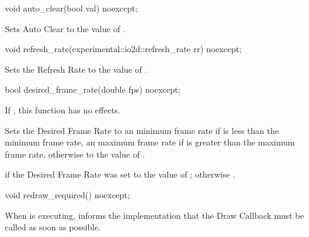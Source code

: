 \begin{itemdecl}
void auto_clear(bool val) noexcept;
\end{itemdecl}
\begin{itemdescr}
\pnum
\effects
Sets Auto Clear to the value of .
\end{itemdescr}

\begin{itemdecl}
void refresh_rate(experimental::io2d::refresh_rate rr) noexcept;
\end{itemdecl}
\begin{itemdescr}
\pnum
\effects
Sets the Refresh Rate to the value of .
\end{itemdescr}

\begin{itemdecl}
bool desired_frame_rate(double fps) noexcept;
\end{itemdecl}
\begin{itemdescr}
\pnum
\effects
If , this function has no effects.

\pnum
Sets the Desired Frame Rate to an  minimum frame rate if  is less than the minimum frame rate, an  maximum frame rate if  is greater than the maximum frame rate, otherwise to the value of .

\pnum
\returns
{} if the Desired Frame Rate was set to the value of ; otherwise .
\end{itemdescr}

\begin{itemdecl}
void redraw_required() noexcept;
\end{itemdecl}
\begin{itemdescr}
\pnum
\effects
When  is executing, informs the implementation that the Draw Callback must be called as soon as possible.
\end{itemdescr}

